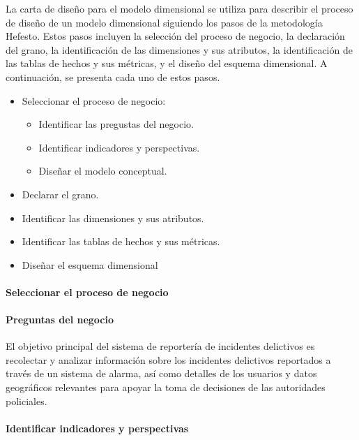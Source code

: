 
La carta de diseño para el modelo dimensional se utiliza para describir el proceso de diseño de un modelo dimensional
siguiendo los pasos de la metodología Hefesto. Estos pasos incluyen la selección del proceso de negocio, la declaración
del grano, la identificación de las dimensiones y sus atributos, la identificación de las tablas de hechos y sus métricas,
y el diseño del esquema dimensional. A continuación, se presenta cada uno de estos pasos.

\begin{itemize}
    \item Seleccionar el proceso de negocio:
          \begin{itemize}
              \item Identificar las pregustas del negocio.
              \item Identificar indicadores y perspectivas.
              \item Diseñar el modelo conceptual.
          \end{itemize}
    \item Declarar el grano.
    \item Identificar las dimensiones y sus atributos.
    \item Identificar las tablas de hechos y sus métricas.
    \item Diseñar el esquema dimensional
\end{itemize}

\paragraph{Seleccionar el proceso de negocio}

\paragraph{Preguntas del negocio}

El objetivo principal del sistema de reportería de incidentes delictivos es recolectar y analizar información
sobre los incidentes delictivos reportados a través de un sistema de alarma, así como detalles de los usuarios
y datos geográficos relevantes para apoyar la toma de decisiones de las autoridades policiales.

\paragraph{Identificar indicadores y perspectivas}

